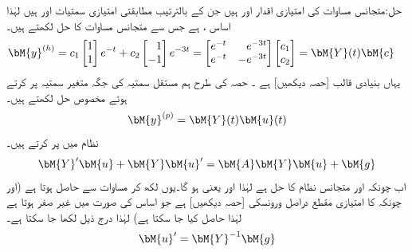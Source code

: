 حل:متجانس مساوات کی امتیازی اقدار  اور  ہیں جن کے بالترتیب مطابقتی امتیازی سمتیات  اور  ہیں لہٰذا  اساس ،  ہے جس سے متجانس مساوات کا حل  لکھتے ہیں۔
\begin{gather}
\begin{aligned}\label{مساوات_نظام_مقدار_معلوم_وائے}
\bM{y}^{(h)}&=c_1\begin{bmatrix}1\\1 \end{bmatrix}e^{-t}+c_2\begin{bmatrix*}[r]  1\\-1\end{bmatrix*}e^{-3t}=\begin{bmatrix*}[r] e^{-t}&e^{-3t} \\ e^{-t} &-e^{-3t} \end{bmatrix*} \begin{bmatrix} c_1\\c_2 \end{bmatrix}=\bM{Y}(t)\bM{c}
\end{aligned}
\end{gather}
یہاں  بنیادی قالب [حصہ  دیکھیں] ہے ۔ حصہ  کی طرح ہم مستقل سمتیہ  کی جگہ متغیر سمتیہ  پر کرتے ہوئے مخصوص حل  لکھتے ہیں۔
\begin{align}
\bM{y}^{(p)}=\bM{Y}(t)\bM{u}(t)
\end{align}
نظام  میں  پر کرتے ہیں۔
\begin{align}\label{مساوات_نظام_بنیادی_نظام_الف}
\bM{Y}'\bM{u}+\bM{Y}\bM{u}'=\bM{A}\bM{Y}\bM{u}+\bM{g}
\end{align}
اب چونکہ  اور  متجانس نظام کا حل ہے لہٰذا  اور
  یعنی ہو گا۔یوں  لکھ کر مساوات  سے   حاصل ہوتا ہے (اور چونکہ  کا امتیازی مقطع دراصل ورونسکی [حصہ  دیکھیں]  ہے جو اساس کی صورت میں غیر صفر ہوتا ہے لہٰذا  حاصل کیا جا سکتا ہے) لہٰذا درج ذیل لکھا جا سکتا ہے۔
\begin{align}
\bM{u}'=\bM{Y}^{-1}\bM{g}
\end{align}
